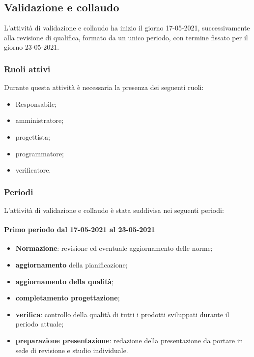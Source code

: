 \clearpage
\subsection{Validazione e collaudo}
L'attività di validazione e collaudo ha inizio il giorno 17-05-2021, successivamente alla revisione di qualifica, formato da un unico periodo, con termine fissato per il giorno 23-05-2021.

\subsubsection{Ruoli attivi}
Durante questa attività è necessaria la presenza dei seguenti ruoli:
\begin{itemize}
	\item Responsabile;
	\item amministratore;
	\item progettista;
	\item programmatore;
	\item verificatore.
\end{itemize}
\subsubsection{Periodi}
L'attività di validazione e collaudo è stata suddivisa nei seguenti periodi:
\paragraph{Primo periodo dal 17-05-2021 al 23-05-2021}
\begin{itemize}
	\item \textbf{Normazione}: revisione ed eventuale aggiornamento delle norme;
	\item \textbf{aggiornamento} della pianificazione;
	\item \textbf{aggiornamento della qualità};
	\item \textbf{completamento progettazione};
	\item \textbf{verifica}: controllo della qualità di tutti i prodotti sviluppati durante il periodo attuale;
	\item \textbf{preparazione presentazione}: redazione della presentazione da portare in sede di revisione e
	studio individuale.
\end{itemize}